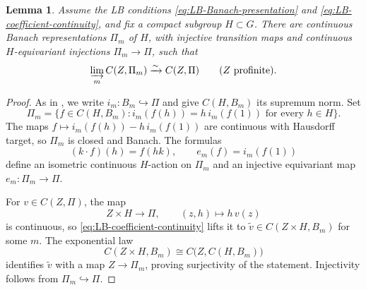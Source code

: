 \documentclass[11pt]{article}
\newtheorem{lemma}[theorem]{Lemma}
\theoremstyle{definition}
\begin{document}
\begin{lemma}
\label{lem:LB-compact-Banach-stages}
Assume the LB conditions \eqref{eq:LB-Banach-presentation} and
\eqref{eq:LB-coefficient-continuity}, and fix a compact subgroup
\(H\subset G\).  There are continuous Banach representations
\(\Pi_m\) of \(H\), with injective transition maps and continuous
\(H\)-equivariant injections \(\Pi_m\to\Pi\), such that
\begin{equation}\label{eq:LB-equivariant-coefficient-continuity}
 \varinjlim_m C(Z,\Pi_m)\xrightarrow{\sim}C(Z,\Pi)
 \qquad(Z\text{ profinite}).
\end{equation}
\end{lemma}
\begin{proof}
As in \cite[Proposition~3.2.14]{EmertonAnalytic}, we write
\(i_m:B_m\hookrightarrow\Pi\) and give \(C(H,B_m)\) its
supremum norm.  Set
\begin{equation*}
 \Pi_m=\bigl\{f\in C(H,B_m):
       i_m(f(h))=h\,i_m(f(1))\text{ for every }h\in H\bigr\}.
\end{equation*}
The maps \(f\mapsto i_m(f(h))-h\,i_m(f(1))\) are continuous
with Hausdorff target, so \(\Pi_m\) is closed and Banach.  The formulas
\begin{equation*}
 (k\cdot f)(h)=f(hk),\qquad
 e_m(f)=i_m(f(1))
\end{equation*}
define an isometric continuous \(H\)-action on \(\Pi_m\) and an
injective equivariant map \(e_m:\Pi_m\to\Pi\).  

For \(v\in C(Z,\Pi)\), the map
\begin{equation*}
 Z\times H\longrightarrow\Pi,\qquad (z,h)\longmapsto h\,v(z)
\end{equation*}
is continuous, so \eqref{eq:LB-coefficient-continuity} lifts it
to \(\widetilde v\in C(Z\times H,B_m)\) for some \(m\).
The exponential law
\begin{equation*}
 C(Z\times H,B_m)\cong C\bigl(Z,C(H,B_m)\bigr)
\end{equation*}
identifies \(\widetilde v\) with a map \(Z\to \Pi_m\), proving
surjectivity of the statement.
Injectivity follows from \(\Pi_m\hookrightarrow\Pi\).
\end{proof}
\end{document}

